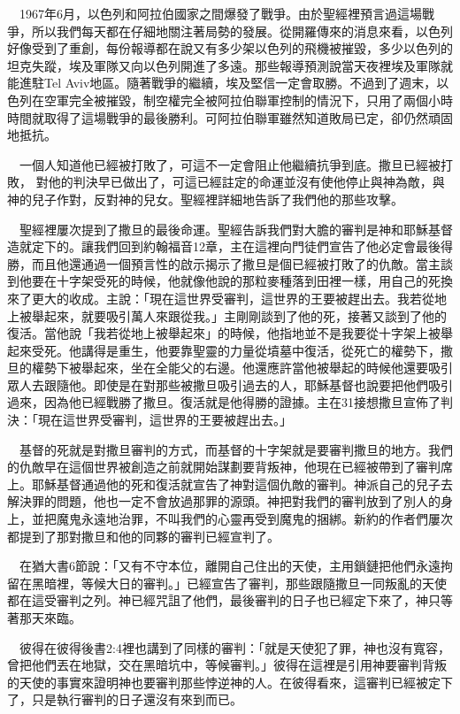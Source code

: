 \documentclass{book}
\begin{document}
　1967年6月，以色列和阿拉伯國家之間爆發了戰爭。由於聖經裡預言過這場戰爭，所以我們每天都在仔細地關注著局勢的發展。從開羅傳來的消息來看，以色列好像受到了重創，每份報導都在說又有多少架以色列的飛機被摧毀，多少以色列的坦克失蹤，埃及軍隊又向以色列開進了多遠。那些報導預測說當天夜裡埃及軍隊就能進駐Tel Aviv地區。隨著戰爭的繼續，埃及堅信一定會取勝。不過到了週末，以色列在空軍完全被摧毀，制空權完全被阿拉伯聯軍控制的情況下，只用了兩個小時時間就取得了這場戰爭的最後勝利。可阿拉伯聯軍雖然知道敗局已定，卻仍然頑固地抵抗。

　一個人知道他已經被打敗了，可這不一定會阻止他繼續抗爭到底。撒旦已經被打敗， 對他的判決早已做出了，可這已經註定的命運並沒有使他停止與神為敵，與神的兒子作對，反對神的兒女。聖經裡詳細地告訴了我們他的那些攻擊。

　聖經裡屢次提到了撒旦的最後命運。聖經告訴我們對大膽的審判是神和耶穌基督造就定下的。讓我們回到約翰福音12章，主在這裡向門徒們宣告了他必定會最後得勝，而且他還通過一個預言性的啟示揭示了撒旦是個已經被打敗了的仇敵。當主談到他要在十字架受死的時候，他就像他說的那粒麥種落到田裡一樣，用自己的死換來了更大的收成。主說：「現在這世界受審判，這世界的王要被趕出去。我若從地上被舉起來，就要吸引萬人來跟從我。」主剛剛談到了他的死，接著又談到了他的復活。當他說「我若從地上被舉起來」的時候，他指地並不是我要從十字架上被舉起來受死。他講得是重生，他要靠聖靈的力量從墳墓中復活，從死亡的權勢下，撒旦的權勢下被舉起來，坐在全能父的右邊。他還應許當他被舉起的時候他還要吸引眾人去跟隨他。即使是在對那些被撒旦吸引過去的人，耶穌基督也說要把他們吸引過來，因為他已經戰勝了撒旦。復活就是他得勝的證據。主在31接想撒旦宣佈了判決：「現在這世界受審判，這世界的王要被趕出去。」

　基督的死就是對撒旦審判的方式，而基督的十字架就是要審判撒旦的地方。我們的仇敵早在這個世界被創造之前就開始謀劃要背叛神，他現在已經被帶到了審判席上。耶穌基督通過他的死和復活就宣告了神對這個仇敵的審判。神派自己的兒子去解決罪的問題，他也一定不會放過那罪的源頭。神把對我們的審判放到了別人的身上，並把魔鬼永遠地治罪，不叫我們的心靈再受到魔鬼的捆綁。新約的作者們屢次都提到了那對撒旦和他的同夥的審判已經宣判了。

　在猶大書6節說：「又有不守本位，離開自己住出的天使，主用鎖鏈把他們永遠拘留在黑暗裡，等候大日的審判。」已經宣告了審判，那些跟隨撒旦一同叛亂的天使都在這受審判之列。神已經咒詛了他們，最後審判的日子也已經定下來了，神只等著那天來臨。

　彼得在彼得後書2:4裡也講到了同樣的審判：「就是天使犯了罪，神也沒有寬容，曾把他們丟在地獄，交在黑暗坑中，等候審判。」彼得在這裡是引用神要審判背叛的天使的事實來證明神也要審判那些悖逆神的人。在彼得看來，這審判已經被定下了，只是執行審判的日子還沒有來到而已。
\end{document}
